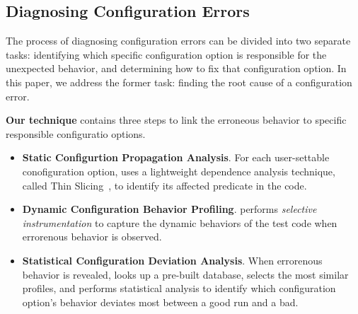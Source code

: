 





\subsection{Diagnosing Configuration Errors}

The process of diagnosing configuration errors can be divided into two
separate tasks: identifying which specific configuration option is
responsible for the unexpected behavior, and determining how to fix that
configuration option. In this paper, we address the former task: finding
the root cause of a configuration error.

\textbf{Our technique} contains three steps to 
link the erroneous behavior to specific responsible configuratio options.

\begin{itemize}
\item \textbf{Static Configurtion Propagation Analysis}. For
each user-settable conofiguration option, \ourtool
uses a lightweight dependence analysis technique, called Thin Slicing~\cite{Sridharan:2007},
to identify its affected predicate in the code.

\item \textbf{Dynamic Configuration Behavior Profiling}. \ourtool
performs \textit{selective instrumentation} to capture the
dynamic behaviors of the test code when errorenous behavior
is observed.

\item \textbf{Statistical Configuration Deviation Analysis}.
When errorenous behavior is revealed, \ourtool looks up a
pre-built database, selects the most similar profiles, and
performs statistical analysis to identify which configuration
option's behavior deviates most between a good run and a bad.

\end{itemize}

